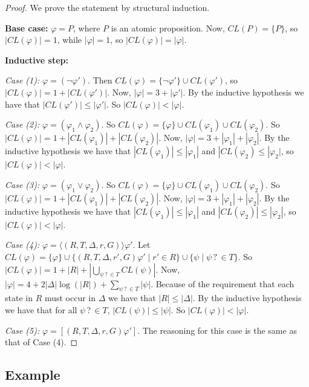 \documentclass[10pt,a4paper]{amsart}
\theoremstyle{plain}
\theoremstyle{definition}
\theoremstyle{definition}
\newcommand{\dbox}[1]{\langle #1 \rangle}
\newcommand{\bbox}[1]{[ #1 ]}
\DeclareMathOperator{\?}{?}
\begin{document}
\pagebreak[5]
\begin{proof}
  We prove the statement by structural induction.

  \textbf{Base case:} $\varphi = P$, where $P$ is an atomic proposition. Now, $CL(P) = \{P\}$, so $|CL(\varphi)| = 1$, while $|\varphi| = 1$, so $|CL(\varphi)| = |\varphi|$.

  \textbf{Inductive step:}

  \textit{Case (1):} $\varphi = (\neg\varphi')$. Then $CL(\varphi) = \{\neg\varphi'\} \cup CL(\varphi')$, so $|CL(\varphi)| = 1 + |CL(\varphi')|$. Now, $|\varphi| = 3 + |\varphi'|$. By the inductive hypothesis we have that $|CL(\varphi')| \leq |\varphi'|$. So $|CL(\varphi)| < |\varphi|$.



  \textit{Case (2):} $\varphi = (\varphi_1 \wedge \varphi_2)$. So $CL(\varphi) = \{\varphi\} \cup CL(\varphi_1) \cup CL(\varphi_2)$. So $|CL(\varphi)| = 1 + |CL(\varphi_1)| + |CL(\varphi_2)|$. Now, $|\varphi| = 3 + |\varphi_1| + |\varphi_2|$. By the inductive hypothesis we have that $|CL(\varphi_1)| \leq |\varphi_1|$ and $|CL(\varphi_2) \leq |\varphi_2|$, so $|CL(\varphi)| < |\varphi|$.

  \textit{Case (3):} $\varphi = (\varphi_1 \vee \varphi_2)$. So $CL(\varphi) = \{\varphi\} \cup CL(\varphi_1) \cup CL(\varphi_2)$. So $|CL(\varphi)| = 1 + |CL(\varphi_1)| + |CL(\varphi_2)|$. Now, $|\varphi| = 3 + |\varphi_1| + |\varphi_2|$. By the inductive hypothesis we have that $|CL(\varphi_1)| \leq |\varphi_1|$ and $|CL(\varphi_2)| \leq |\varphi_2|$, so $|CL(\varphi)| < |\varphi|$.

  \textit{Case (4):} $\varphi = \dbox{(R,T,\Delta,r,G)}\varphi'$. Let $CL(\varphi) = \{\varphi\} \cup \{(R,T,\Delta,r',G)\varphi' \mid r' \in R \} \cup \{ \psi \mid \psi\? \in T\}$. So $|CL(\varphi)| = 1 + |R| + |\bigcup\limits_{\psi\? \in T}CL(\psi)|$. Now, $|\varphi| = 4 + 2|\Delta|\log(|R|) + \sum\limits_{\psi\? \in T}|\psi|$. Because of the requirement that each state in $R$ must occur in $\Delta$ we have that $|R| \leq |\Delta|$. By the inductive hypothesis we have that for all $\psi\? \in T$, $|CL(\psi)| \leq |\psi|$. So $|CL(\varphi)| < |\varphi|$.

  \textit{Case (5):} $\varphi = \bbox{(R,T,\Delta,r,G)\varphi'}$. The reasoning for this case is the same as that of Case (4).
\end{proof}

\subsection{Example}
\end{document}

